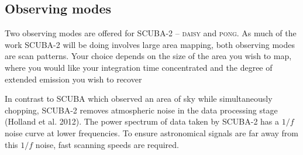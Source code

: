 \documentclass[twoside,11pt]{article}
\newcommand{\xlabel}[1]{}
\renewcommand{\_}{\texttt{\symbol{95}}}
\begin{document}
\subsection{\xlabel{obs_modes}Observing modes}
\label{sec:mmodes}

Two observing modes are offered for SCUBA-2 -- \textsc{daisy} and \textsc{pong}. As much of the work SCUBA-2 will be doing involves large area mapping, both observing modes are scan patterns. Your choice depends on the size of the area you wish to map, where you would like your integration time concentrated and the degree of extended emission you wish to recover

In contrast to SCUBA which observed an area of sky while simultaneously chopping, SCUBA-2 removes atmospheric noise in the data processing stage (Holland et al. 2012). The power spectrum of data taken by SCUBA-2 has a $1/f$ noise curve at lower frequencies. To ensure astronomical signals are far away from this $1/f$ noise, fast scanning speeds are required. 
\end{document}
